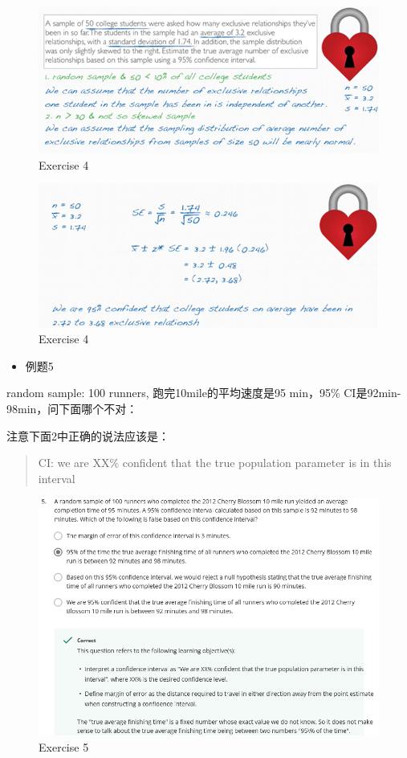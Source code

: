 \documentclass[]{book}
\providecommand{\tightlist}{%
  \setlength{\itemsep}{0pt}\setlength{\parskip}{0pt}}
\begin{document}
\begin{figure}

{\centering \includegraphics[width=0.8\linewidth]{graphs/2-17} 

}

\caption{Exercise 4}\label{fig:fig2-171}
\end{figure}\begin{figure}

{\centering \includegraphics[width=0.8\linewidth]{graphs/2-18} 

}

\caption{Exercise 4}\label{fig:fig2-172}
\end{figure}

\begin{itemize}
\tightlist
\item
  例题5
\end{itemize}

random sample: 100 runners, 跑完10mile的平均速度是95 min，95\%
CI是92min-98min，问下面哪个不对：

注意下面2中正确的说法应该是：

\begin{quote}
CI: we are XX\% confident that the true population parameter is in this
interval
\end{quote}

\begin{figure}

{\centering \includegraphics[width=0.8\linewidth]{graphs/2-19} 

}

\caption{Exercise 5}\label{fig:fig2-19}
\end{figure}
\end{document}
